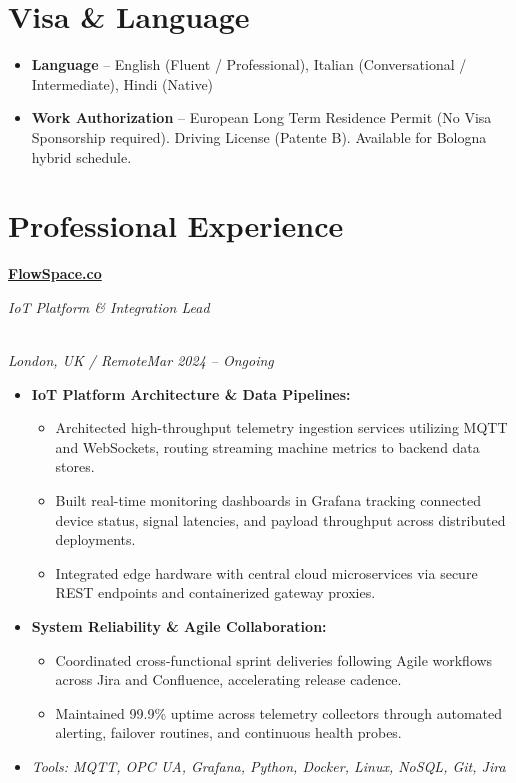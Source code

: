 \documentclass[a4paper,10pt]{article}
\newcommand{\role}[4]{\vspace{3pt}\noindent\hspace{0.6em}\parbox[t]{0.38\textwidth}{\raggedright\textbf{#1}}\hfill\parbox[t]{0.58\textwidth}{\raggedleft\textit{#2}}\\{\textit{#3}\hfill\textit{#4}}\vspace{1pt}}
\begin{document}
\section{Visa \& Language}
\begin{itemize}
\item \textbf{Language} -- English (Fluent / Professional), Italian (Conversational / Intermediate), Hindi (Native)
\item \textbf{Work Authorization} -- European Long Term Residence Permit (No Visa Sponsorship required). Driving License (Patente B). Available for Bologna hybrid schedule.
\end{itemize}

\section{Professional Experience}
\role{\href{https://flowspace.co}{FlowSpace.co}}{IoT Platform \& Integration Lead}{London, UK / Remote}{Mar 2024 -- Ongoing}
\begin{itemize}
\item \textbf{IoT Platform Architecture \& Data Pipelines:}
\begin{itemize}[label=--]
\item Architected high-throughput telemetry ingestion services utilizing MQTT and WebSockets, routing streaming machine metrics to backend data stores.
\item Built real-time monitoring dashboards in Grafana tracking connected device status, signal latencies, and payload throughput across distributed deployments.
\item Integrated edge hardware with central cloud microservices via secure REST endpoints and containerized gateway proxies.
\end{itemize}
\item \textbf{System Reliability \& Agile Collaboration:}
\begin{itemize}[label=--]
\item Coordinated cross-functional sprint deliveries following Agile workflows across Jira and Confluence, accelerating release cadence.
\item Maintained 99.9\% uptime across telemetry collectors through automated alerting, failover routines, and continuous health probes.
\end{itemize}
\item \textit{Tools: MQTT, OPC UA, Grafana, Python, Docker, Linux, NoSQL, Git, Jira}
\end{itemize}
\end{document}
